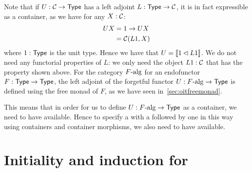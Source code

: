 \documentclass[a4paper,10pt]{report}
\begin{document}

Note that if $U : \mathcal{C} \to \mathsf{Type}$ has a left adjoint $L : \mathsf{Type} \to \mathcal{C}$,
it is in fact expressible as a container, as we have for any $X : \mathcal{C}$:
%
\begin{align*}
  U X &= 1 \to U X \\
      &= \mathcal{C}(L1, X)
\end{align*}
%
where $1 : \mathsf{Type}$ is the unit type. Hence we have that
$U = \llbracket 1 \lhd L 1 \rrbracket$. We do not need any functorial properties of $L$:
we only need the object $L1 : \mathcal{C}$ that has the property shown
above. For the category $F\mbox{-alg}$ for an endofunctor
$F : \mathsf{Type} \to \mathsf{Type}$, the left adjoint of the forgetful functor
$U : F\mbox{-alg} \to \mathsf{Type}$ is defined using the free monad of $F$, as
we have seen in~\cref{sec:oitfreemonad}.

This means that in order for us to define $U : F\mbox{-alg} \to \mathsf{Type}$
as a container, we need to have \oits available. Hence to specify \eg
a \hit with a \zeroconstructor followed by one \oneconstructor in this
way using containers and container morphisms, we also need to have
\oits available.

\chapter{Initiality and induction for \onehits}
\label{sec:onehits}
\end{document}
